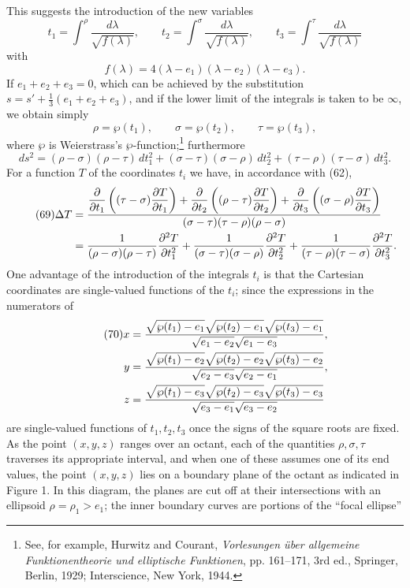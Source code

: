 This suggests the introduction of the new variables
\[
t_1=\int^\rho\frac{d\lambda}{\sqrt{f(\lambda)}},\qquad
t_2=\int^\sigma\frac{d\lambda}{\sqrt{f(\lambda)}},\qquad
t_3=\int^\tau\frac{d\lambda}{\sqrt{f(\lambda)}}
\]
with
\[
f(\lambda)=4(\lambda-e_1)(\lambda-e_2)(\lambda-e_3).
\]
If $e_1+e_2+e_3=0$, which can be achieved by the substitution $s=s'+\tfrac13(e_1+e_2+e_3)$, and if the lower limit of the integrals is taken to be $\infty$, we obtain simply
\[
\rho=\wp(t_1),\qquad \sigma=\wp(t_2),\qquad \tau=\wp(t_3),
\]
where $\wp$ is Weierstrass's $\wp$-function;\footnote{See, for example, Hurwitz and Courant, \emph{Vorlesungen \"uber allgemeine Funktionentheorie und elliptische Funktionen}, pp. 161--171, 3rd ed., Springer, Berlin, 1929; Interscience, New York, 1944.} furthermore
\[
ds^2=(\rho-\sigma)(\rho-\tau)\,dt_1^2+(\sigma-\tau)(\sigma-\rho)\,dt_2^2+(\tau-\rho)(\tau-\sigma)\,dt_3^2.
\]
For a function $T$ of the coordinates $t_i$ we have, in accordance with (62),
\begin{align}\tag{69}
\Delta T
&=\frac{\dfrac{\partial}{\partial t_1}\left((\tau-\sigma)\dfrac{\partial T}{\partial t_1}\right)
+\dfrac{\partial}{\partial t_2}\left((\rho-\tau)\dfrac{\partial T}{\partial t_2}\right)
+\dfrac{\partial}{\partial t_3}\left((\sigma-\rho)\dfrac{\partial T}{\partial t_3}\right)}
{(\sigma-\tau)(\tau-\rho)(\rho-\sigma)}\notag\\
&=\frac1{(\rho-\sigma)(\rho-\tau)}\frac{\partial^2T}{\partial t_1^2}
+\frac1{(\sigma-\tau)(\sigma-\rho)}\frac{\partial^2T}{\partial t_2^2}
+\frac1{(\tau-\rho)(\tau-\sigma)}\frac{\partial^2T}{\partial t_3^2}.
\end{align}
One advantage of the introduction of the integrals $t_i$ is that the Cartesian coordinates are single-valued functions of the $t_i$; since the expressions in the numerators of
\begin{align}\tag{70}
x&=\frac{\sqrt{\wp(t_1)-e_1}\sqrt{\wp(t_2)-e_1}\sqrt{\wp(t_3)-e_1}}{\sqrt{e_1-e_2}\sqrt{e_1-e_3}},\notag\\
y&=\frac{\sqrt{\wp(t_1)-e_2}\sqrt{\wp(t_2)-e_2}\sqrt{\wp(t_3)-e_2}}{\sqrt{e_2-e_3}\sqrt{e_2-e_1}},\notag\\
z&=\frac{\sqrt{\wp(t_1)-e_3}\sqrt{\wp(t_2)-e_3}\sqrt{\wp(t_3)-e_3}}{\sqrt{e_3-e_1}\sqrt{e_3-e_2}}
\end{align}
are single-valued functions of $t_1,t_2,t_3$ once the signs of the square roots are fixed. As the point $(x,y,z)$ ranges over an octant, each of the quantities $\rho,\sigma,\tau$ traverses its appropriate interval, and when one of these assumes one of its end values, the point $(x,y,z)$ lies on a boundary plane of the octant as indicated in Figure 1. In this diagram, the planes are cut off at their intersections with an ellipsoid $\rho=\rho_1>e_1$; the inner boundary curves are portions of the ``focal ellipse''
